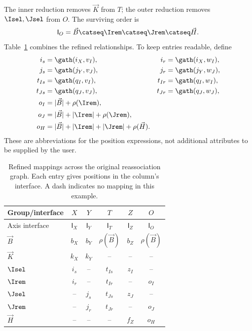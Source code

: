 The inner reduction removes $\vec K$ from $T$; the outer reduction removes
$\Isel,\Jsel$ from $O$. The surviving order is
\begin{equation}
 \mathsf{I}_O=\vec B\catseq\Irem\catseq\Jrem\catseq \vec H.
\label{extended:eq:source-output}
\end{equation}
Table~\ref{extended:tab:refined-mappings} combines the refined relationships. To keep
entries readable, define
\begin{equation}
\begin{aligned}
 i_s&=\gath(i_X,v_I),&i_r&=\gath(i_X,w_I),\\
 j_s&=\gath(j_Y,v_J),&j_r&=\gath(j_Y,w_J),\\
 t_{Is}&=\gath(q_I,v_I),&t_{Ir}&=\gath(q_I,w_I),\\
 t_{Js}&=\gath(q_J,v_J),&t_{Jr}&=\gath(q_J,w_J),\\
 o_I&=|\vec B|+\rho(\Irem),\\
 o_J&=|\vec B|+|\Irem|+\rho(\Jrem),\\
 o_H&=|\vec B|+|\Irem|+|\Jrem|+\rho(\vec H).
\end{aligned}
\end{equation}
These are abbreviations for the position expressions, not additional
attributes to be supplied by the user.
\begin{table}[htbp]
\caption{Refined mappings across the original reassociation graph. Each entry
gives positions in the column's interface. A dash indicates no mapping in
this example.}
\label{extended:tab:refined-mappings}
\centering
\begin{tabular}{@{}lccccc@{}}\toprule
Group/interface & $X$ & $Y$ & $T$ & $Z$ & $O$\\\midrule
Axis interface & $\mathsf{I}_X$ & $\mathsf{I}_Y$ & $\mathsf{I}_T$ & $\mathsf{I}_Z$ & $\mathsf{I}_O$\\
$\vec B$ & $b_X$ & $b_Y$ & $\rho(\vec B)$ & $b_Z$ & $\rho(\vec B)$\\
$\vec K$ & $k_X$ & $k_Y$ & -- & -- & --\\
$\Isel$ & $i_s$ & -- & $t_{Is}$ & $z_I$ & --\\
$\Irem$ & $i_r$ & -- & $t_{Ir}$ & -- & $o_I$\\
$\Jsel$ & -- & $j_s$ & $t_{Js}$ & $z_J$ & --\\
$\Jrem$ & -- & $j_r$ & $t_{Jr}$ & -- & $o_J$\\
$\vec H$ & -- & -- & -- & $f_Z$ & $o_H$\\\bottomrule
\end{tabular}
\end{table}

